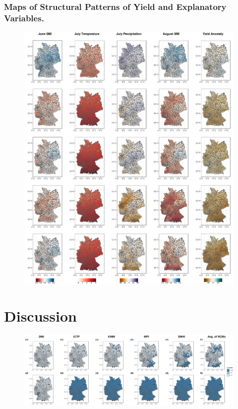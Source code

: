 \documentclass[12pt]{iopart}
\begin{document}
\subsubsection{Maps of Structural Patterns of Yield and Explanatory Variables.}
\begin{figure}
	\label{map:1f}
	\centering
	\includegraphics[width=1\textwidth]{figures/structural.png}
	\caption{}
\end{figure}







\section{Discussion}

\begin{figure}
	\label{map:2f}
	\centering
	\includegraphics[width=1\textwidth]{figures/Wilcoxon_AllRCMs.png}
	\caption{}
\end{figure}


\newcommand{\newblock}{}

%
\end{document}
